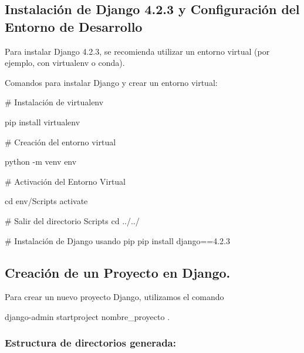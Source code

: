 \documentclass[
  letterpaper,
  DIV=11,
  numbers=noendperiod]{scrartcl}
\newenvironment{Shaded}{\begin{snugshade}}{\end{snugshade}}
\newcommand{\AttributeTok}[1]{\textcolor[rgb]{0.40,0.45,0.13}{#1}}
\newcommand{\BuiltInTok}[1]{\textcolor[rgb]{0.00,0.23,0.31}{#1}}
\newcommand{\CommentTok}[1]{\textcolor[rgb]{0.37,0.37,0.37}{#1}}
\newcommand{\ExtensionTok}[1]{\textcolor[rgb]{0.00,0.23,0.31}{#1}}
\newcommand{\NormalTok}[1]{\textcolor[rgb]{0.00,0.23,0.31}{#1}}
\begin{document}
\hypertarget{instalaciuxf3n-de-django-4.2.3-y-configuraciuxf3n-del-entorno-de-desarrollo}{%
\subsection{Instalación de Django 4.2.3 y Configuración del Entorno de
Desarrollo}\label{instalaciuxf3n-de-django-4.2.3-y-configuraciuxf3n-del-entorno-de-desarrollo}}

Para instalar Django 4.2.3, se recomienda utilizar un entorno virtual
(por ejemplo, con virtualenv o conda).

Comandos para instalar Django y crear un entorno virtual:

\begin{Shaded}
\begin{Highlighting}[]
\CommentTok{\# Instalación de virtualenv}

\ExtensionTok{pip}\NormalTok{ install virtualenv}

\CommentTok{\# Creación del entorno virtual}

\ExtensionTok{python} \AttributeTok{{-}m}\NormalTok{ venv env}

\CommentTok{\# Activación del Entorno Virtual}

\BuiltInTok{cd}\NormalTok{ env/Scripts}
\ExtensionTok{activate}

\CommentTok{\# Salir del directorio Scripts}
\BuiltInTok{cd}\NormalTok{ ../../}

\CommentTok{\# Instalación de Django usando pip}
\ExtensionTok{pip}\NormalTok{ install django==4.2.3}
\end{Highlighting}
\end{Shaded}

\hypertarget{creaciuxf3n-de-un-proyecto-en-django.}{%
\subsection{Creación de un Proyecto en
Django.}\label{creaciuxf3n-de-un-proyecto-en-django.}}

Para crear un nuevo proyecto Django, utilizamos el comando

\begin{Shaded}
\begin{Highlighting}[]
\ExtensionTok{django{-}admin}\NormalTok{ startproject nombre\_proyecto .}
\end{Highlighting}
\end{Shaded}

\hypertarget{estructura-de-directorios-generada}{%
\subsubsection{Estructura de directorios
generada:}\label{estructura-de-directorios-generada}}
\end{document}
